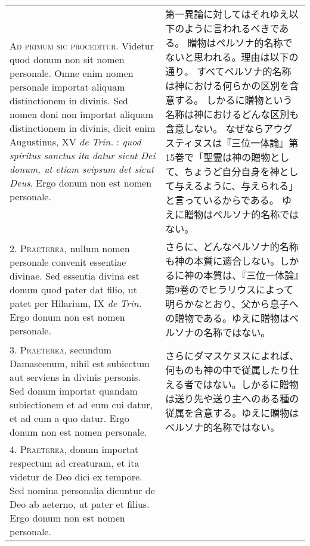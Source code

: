 \documentclass[10pt]{jsarticle} %
\begin{document}
\begin{longtable}{p{21em}p{21em}}

\textsc{Ad primum sic proceditur}. Videtur quod donum non sit nomen
    personale. Omne enim nomen personale importat aliquam
    distinctionem in divinis. Sed nomen doni non importat aliquam
    distinctionem in divinis, dicit enim Augustinus, XV \textit{de
    Trin.} : \textit{quod spiritus sanctus ita datur sicut Dei donum,
    ut etiam seipsum det sicut Deus}. Ergo donum non est nomen
    personale.


&

第一異論に対してはそれゆえ以下のように言われるべきである。
贈物はペルソナ的名称でないと思われる。理由は以下の通り。
すべてペルソナ的名称は神における何らかの区別を含意する。
しかるに贈物という名称は神におけるどんな区別も含意しない。
なぜならアウグスティヌスは『三位一体論』第15巻で「聖霊は神の贈物とし
て、ちょうど自分自身を神として与えるように、与えられる」と言っているからである。
ゆえに贈物はペルソナ的名称ではない。

\\


2. \textsc{Praeterea}, nullum nomen personale convenit essentiae divinae. Sed
essentia divina est donum quod pater dat filio, ut patet per Hilarium, IX
\textit{de Trin.} Ergo donum non est nomen personale.


&

さらに、どんなペルソナ的名称も神の本質に適合しない。しかるに神の本質は、『三位一体論』第9巻のでヒラリウスによって明らかなとおり、父から息子への贈物である。ゆえに贈物はペルソナの名称ではない。

\\

3. \textsc{Praeterea}, secundum Damascenum, nihil est subiectum aut serviens in
divinis personis. Sed donum importat quandam subiectionem et ad eum cui datur,
et ad eum a quo datur. Ergo donum non est nomen personale.


&

さらにダマスケヌスによれば、何ものも神の中で従属したり仕える者ではない。しかるに贈物は送り先や送り主へのある種の従属を含意する。ゆえに贈物はペルソナ的名称ではない。

\\

4. \textsc{Praeterea}, donum importat respectum ad creaturam, et ita videtur de Deo dici ex tempore. Sed nomina personalia dicuntur de Deo ab aeterno, ut pater et filius. Ergo donum non est nomen personale.



\end{longtable}
\end{document}
